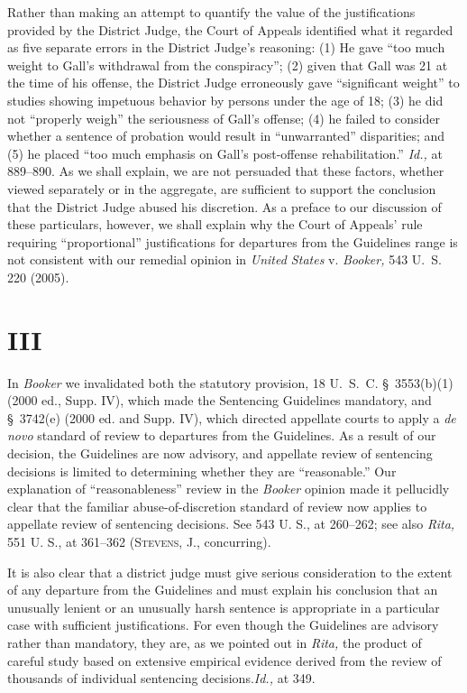   Rather than making an attempt to quantify the value of the
justifications provided by the District Judge, the Court of Appeals
identified what it regarded as five separate errors in the District
Judge's reasoning: (1) He gave ``too much weight to Gall's
withdrawal from the conspiracy''; (2) given that Gall was 21 at the
time of his offense, the District Judge erroneously gave ``significant
weight'' to studies showing impetuous behavior by persons under the age
of 18; (3) he did not ``properly weigh'' the seriousness of Gall's
offense; (4) he failed to consider whether a sentence of probation
would result in ``unwarranted'' disparities; and (5) he placed ``too
much emphasis on Gall's post-offense rehabilitation.'' \emph{Id.,}
at 889--890. As we shall explain, we are not persuaded that these
factors, whether viewed separately or in the aggregate, are sufficient
to support the conclusion that the District \newpage  Judge abused his
discretion. As a preface to our discussion of these particulars,
however, we shall explain why the Court of Appeals' rule requiring
``proportional'' justifications for departures from the Guidelines
range is not consistent with our remedial opinion in \emph{United States}
v. \emph{Booker,} 543 U.~S. 220 (2005).

\section{III}

  In \emph{Booker} we invalidated both the statutory provision, 18
U.~S.~C. \S~3553(b)(1) (2000 ed., Supp. IV), which made the
Sentencing Guidelines mandatory, and \S~3742(e) (2000 ed. and Supp.
IV), which directed appellate courts to apply a \emph{de novo} standard of
review to departures from the Guidelines. As a result of our decision,
the Guidelines are now advisory, and appellate review of sentencing
decisions is limited to determining whether they are ``reasonable.''
Our explanation of ``reasonableness'' review in the \emph{Booker} opinion
made it pellucidly clear that the familiar abuse-of-discretion standard
of review now applies to appellate review of sentencing decisions. See
543 U. S., at 260--262; see also \emph{Rita,} 551 U. S., at 361--362
(\textsc{Stevens,} J., concurring).

  It is also clear that a district judge must give serious consideration
to the extent of any departure from the Guidelines and must explain his
conclusion that an unusually lenient or an unusually harsh sentence is
appropriate in a particular case with sufficient justifications. For
even though the Guidelines are advisory rather than mandatory, they are,
as we pointed out in \emph{Rita,} the product of careful study based on
extensive empirical evidence derived from the review of thousands of
individual sentencing decisions.\footnotemark[2] \emph{Id.,} at 349.\newpage 


